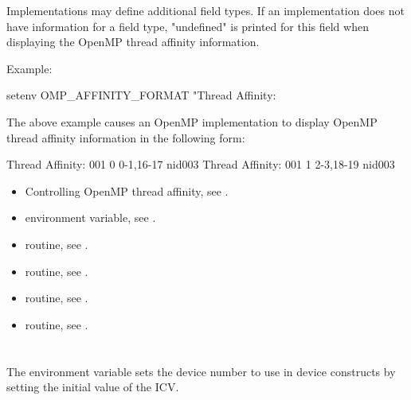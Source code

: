 \linenumbers


Implementations may define additional field types.  If an implementation does not have information
for a field type, "undefined" is printed for this field when displaying the OpenMP thread 
affinity information.



Example:
\begin{ompEnv}
setenv OMP_AFFINITY_FORMAT
       "Thread Affinity: %
\end{ompEnv}

The above example causes an OpenMP implementation to display OpenMP thread affinity information in the following form:
\begin{ompSyntax}
Thread Affinity: 001        0      0-1,16-17      nid003
Thread Affinity: 001        1      2-3,18-19      nid003
\end{ompSyntax}

\crossreferences
\begin{itemize}
\item Controlling OpenMP thread affinity, see
.
\item {} environment variable, see
.
\item {} routine, see .
\item {} routine, see .
\item {} routine, see .
\item {} routine, see .
\end{itemize}


\section{}
\label{sec:OMP_DEFAULT_DEVICE}
The  environment variable sets the device number to use in
device constructs by setting the initial value of the  ICV.

